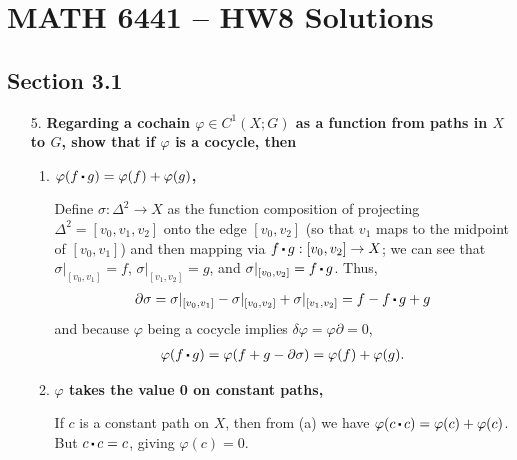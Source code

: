 \documentclass[12pt]{article}
\newcommand*\sq{\mathbin{\vcenter{\hbox{\rule{.4ex}{.4ex}}}}}
\begin{document}
\section*{MATH 6441 -- HW8 Solutions}
\subsection*{Section 3.1}
\begin{enumerate}
    \item[5.]
        \boldmath\textbf{Regarding a cochain $\varphi \in C^1(X; G)$ as a function from paths in $X$ to $G$, show that if $\varphi$ is a cocycle, then
        }\unboldmath \par
        \begin{enumerate}
            \item
                \boldmath\textbf{$\varphi(f \sq g) = \varphi(f) + \varphi(g)$,
                }\unboldmath \par
                Define $\sigma : \Delta^2 \to X$ as the function composition of projecting $\Delta^2 = [v_0, v_1, v_2]$ onto the edge $[v_0, v_2]$ (so that $v_1$ maps to the midpoint of $[v_0, v_1]$) and then mapping via $f \sq g : [v_0, v_2] \to X$; we can see that $\sigma|_{[v_0, v_1]} = f$, $\sigma|_{[v_1, v_2]} = g$, and $\sigma|_{[v_0, v_2]} = f \sq g$. Thus,
                \begin{align*}
                    \partial\sigma = \sigma|_{[v_0, v_1]} - \sigma|_{[v_0, v_2]} + \sigma|_{[v_1, v_2]} = f - f \sq g + g
                \end{align*}
                and because $\varphi$ being a cocycle implies $\delta\varphi = \varphi\partial = 0$,
                \begin{align*}
                    \varphi(f \sq g) = \varphi(f + g - \partial\sigma) = \varphi(f) + \varphi(g).
                \end{align*}

            \item
                \boldmath\textbf{$\varphi$ takes the value 0 on constant paths,
                }\unboldmath \par

                If $c$ is a constant path on $X$, then from (a) we have $\varphi(c \sq c) = \varphi(c) + \varphi(c)$. But $c \sq c = c$, giving $\varphi(c) = 0$.


\end{enumerate}
\end{enumerate}
\end{document}
